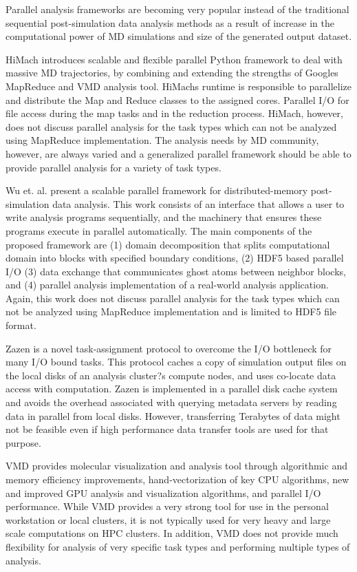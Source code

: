 \label{background}

Parallel analysis frameworks are becoming very popular instead of the traditional sequential post-simulation data analysis methods as a result of increase in the computational power of MD simulations and size of the generated output dataset.

HiMach \cite{himach-2008} introduces scalable and flexible parallel Python framework to deal with massive MD trajectories, by combining and extending the strengths of Google\textsc{}s MapReduce and VMD analysis tool. 
HiMach\textsc{}s runtime is responsible to parallelize and distribute the Map and Reduce classes to the assigned cores.
Parallel I/O for file access during the map tasks and  in the reduction process. 
HiMach, however, does not discuss parallel analysis for the task types which can not be analyzed using MapReduce implementation.
The analysis needs by MD community, however, are always varied and a generalized parallel framework should be able to provide parallel analysis for a variety of task types.

Wu et. al. \cite{Wu_et.al} present a scalable parallel framework for distributed-memory post-simulation data analysis.
This work consists of an interface that allows a user to write analysis programs sequentially, and the machinery that ensures these programs execute in parallel automatically. 
The main components of the proposed framework are (1) domain decomposition that splits computational domain into blocks with specified boundary conditions, (2) HDF5 based parallel I/O (3) data exchange
that communicates ghost atoms between neighbor blocks, and (4) parallel analysis implementation of a real-world analysis application.
Again, this work does not discuss parallel analysis for the task types which can not be analyzed using MapReduce implementation and is limited to HDF5 file format.

Zazen \cite{Zazen} is a novel task-assignment protocol to overcome the I/O bottleneck for many I/O bound tasks.
This protocol caches a copy of simulation output files on the local disks of an analysis cluster?s compute nodes, and uses co-locate data access with computation. 
Zazen is implemented in a parallel disk cache system and avoids the overhead associated with querying metadata servers by reading data in parallel from local disks.
However, transferring Terabytes of data might not be feasible even if high performance data transfer tools are used for that purpose.

VMD \cite{VMD2013} provides molecular visualization and analysis tool through algorithmic and memory efficiency improvements, hand-vectorization of key CPU algorithms, new and improved GPU analysis and
visualization algorithms, and parallel I/O performance.
While VMD provides a very strong tool for use in the personal workstation or local clusters, it is not typically used for very heavy and large scale computations on HPC clusters.
In addition, VMD does not provide much flexibility for analysis of very specific task types and performing multiple types of analysis.

